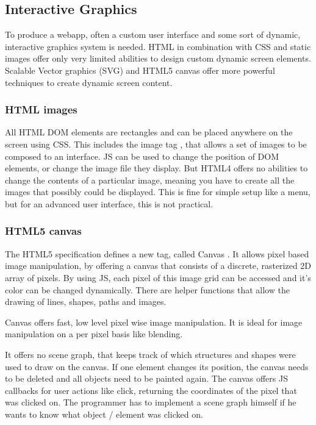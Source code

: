 \subsection{Interactive Graphics}
\label{sec:graphics}

To produce a webapp, often a custom user interface and some sort of dynamic, interactive graphics system is needed.
HTML in combination with CSS and static images offer only very limited abilities to design custom dynamic screen elements.
Scalable Vector graphics (SVG) and HTML5 canvas offer more powerful techniques to create dynamic screen content.


\subsubsection{HTML images}
\label{sec:htmlimg}

All HTML DOM elements are rectangles and can be placed anywhere on the screen using CSS.
This includes the image tag , that allows a set of images to be composed to an interface.
JS can be used to change the position of DOM elements, or change the image file they display.
But HTML4 offers no abilities to change the contents of a particular image, meaning you have to create all the images that possibly could be displayed.
This is fine for simple setup like a menu, but for an advanced user interface, this is not practical.


\subsubsection{HTML5 canvas}
\label{sec:canvas}

The HTML5 specification defines a new tag, called Canvas .
It allows pixel based image manipulation, by offering a canvas that consists of a discrete, rasterized 2D array of pixels.
By using JS, each pixel of this image grid can be accessed and it's color can be changed dynamically.
There are helper functions that allow the drawing of lines, shapes, paths and images.

Canvas offers fast, low level pixel wise image manipulation.
It is ideal for image manipulation on a per pixel basis like blending.

It offers no scene graph, that keeps track of which structures and shapes were used to draw on the canvas.
If one element changes its position, the canvas needs to be deleted and all objects need to be painted again.
The canvas offers JS callbacks for user actions like click, returning the coordinates of the pixel that was clicked on.
The programmer has to implement a scene graph himself if he wants to know what object / element was clicked on.

